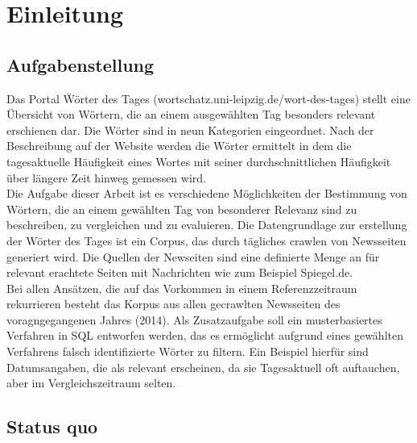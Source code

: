 


\ourtitlepage 
\tableofcontents
{} %
\clearpage
{} %



\chapter{Einleitung}

\section{Aufgabenstellung}
Das Portal \" W\"orter des Tages (wortschatz.uni-leipzig.de/wort-des-tages) stellt eine \"Ubersicht von W\"ortern, die an einem ausgew\"ahlten Tag besonders relevant erschienen dar. Die W\"orter sind in neun Kategorien eingeordnet. Nach der Beschreibung auf der Website werden die W\"orter ermittelt in dem die tagesaktuelle H\"aufigkeit eines Wortes mit seiner durchschnittlichen H\"aufigkeit \"uber l\"angere Zeit hinweg gemessen wird.\\
Die Aufgabe dieser Arbeit ist es verschiedene M\"oglichkeiten der Bestimmung von W\"ortern, die an einem gew\"ahlten Tag von besonderer Relevanz sind zu beschreiben, zu vergleichen und zu evaluieren. 
Die Datengrundlage zur erstellung der W\"orter des Tages ist ein Corpus, das durch t\"agliches crawlen von Newsseiten generiert wird. Die Quellen der Newseiten sind eine definierte Menge an f\"ur relevant erachtete Seiten mit Nachrichten wie zum Beispiel Spiegel.de.\\
Bei allen Ansätzen, die auf das Vorkommen in einem Referenzzeitraum rekurrieren besteht das Korpus aus allen gecrawlten Newsseiten des voragngegangenen Jahres (2014).
Als Zusatzaufgabe soll ein musterbasiertes Verfahren in SQL entworfen werden, das es erm\"oglicht aufgrund eines gew\"ahlten Verfahrens falsch identifizierte W\"orter zu filtern. Ein Beispiel hierf\"ur sind Datumsangaben, die als relevant erscheinen, da sie Tagesaktuell oft auftauchen, aber im Vergleichszeitraum selten.

\section{Status quo}

